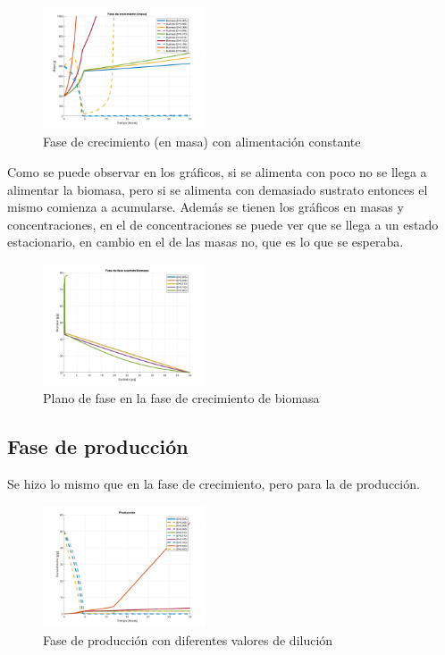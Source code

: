 \documentclass[letterpaper, 10 pt, conference]{ieeeconf}  %
\begin{document}
\begin{figure}[H]
  \centering
  \includegraphics[width=0.43\textwidth]{./Images_tp1/D1_growth_complete_mass.png}
  \caption{Fase de crecimiento (en masa) con alimentación constante}
\end{figure}

Como se puede observar en los gráficos, si se alimenta con poco no se llega a alimentar la biomasa, pero si se alimenta con demasiado sustrato entonces el mismo comienza a acumularse. Además se tienen los gráficos en masas y concentraciones, en el de concentraciones se puede ver que se llega a un estado estacionario, en cambio en el de las masas no, que es lo que se esperaba.

\begin{figure}[H]
  \centering
  \includegraphics[width=0.43\textwidth]{./Images_tp1/D1_plano_fase.png}
  \caption{Plano de fase en la fase de crecimiento de biomasa}
\end{figure}

\subsection{Fase de producción}
Se hizo lo mismo que en la fase de crecimiento, pero para la de producción.

\begin{figure}[H]
  \centering
  \includegraphics[width=0.43\textwidth]{./Images_tp1/D1_plastic.png}
  \caption{Fase de producción con diferentes valores de dilución}
\end{figure}
\end{document}
